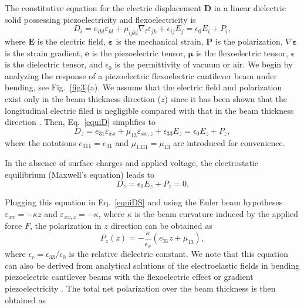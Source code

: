 \documentclass[%
 aps,prl,showpacs,
 amsmath,amssymb,
 reprint,%
]{revtex4-1}
\begin{document}
The constitutive equation for the electric displacement $\mathbf{D}$ in a linear dielectric solid possessing piezoelectricity and flexoelectricity is
\begin{equation}
D_i =  e_{ikl} \varepsilon_{kl} + \mu_{ijkl} \nabla_l \varepsilon_{jk} + \epsilon_{ij}E_j =  \epsilon_{0}E_i + P_i , \label{equiD}
\end{equation}
where $\mathbf{E}$ is the electric field, $\mathbf{\varepsilon}$ is the mechanical strain, $\mathbf{P}$ is the polarization, $\nabla \mathbf{\varepsilon}$ is the strain gradient,
 $\mathbf{e}$ is the piezoelectric tensor, $\mathbf{\mu}$  is the flexoelectric tensor, $\mathbf{\epsilon}$ is the dielectric tensor, and $\epsilon_0$ is the permittivity of vacuum or air. We begin by analyzing the response of a
piezoelectric flexoelectric cantilever beam under bending, see Fig.~\ref{fig3}(a). We assume that the electric field and polarization exist only in the 
beam thickness direction ($z$) since it has been shown that the longitudinal electric filed is negligible compared with that in the beam thickness direction \cite{Gao2007, Wang2010}. Then, Eq.~\eqref{equiD} simplifies to
\begin{equation}
D_z =  e_{31} \varepsilon_{xx} + \mu_{13} \varepsilon_{xx,z} + \epsilon_{33}E_z =  \epsilon_{0}E_z + P_z , \label{equiDS}
\end{equation}
where the notations $e_{311} = e_{31}$ and  $\mu_{1331} = \mu_{13}$ are introduced for convenience.

In the absence of surface charges and applied voltage, the electrostatic equilibrium (Maxwell's equation) leads to 
\begin{equation}
D_z  =  \epsilon_{0}E_z + P_z = 0. \label{equiD0}
\end{equation}

Plugging this equation in Eq.~\eqref{equiDS} and using the Euler beam hypotheses $\varepsilon_{xx} = -\kappa z$ and $\varepsilon_{xx,z} = -\kappa$, 
where $\kappa$ is the beam curvature induced by the applied force $F$, the polarization in $z$ direction can be obtained as
\begin{equation}
P_z (z) = - \frac{\kappa}{\epsilon_r} (e_{31} z + \mu_{13}), \label{equiPz}
\end{equation}
where $\epsilon_r = \epsilon_{33}/\epsilon_0$ is the relative dielectric constant. We note that this equation can also be derived from analytical solutions of the electroelastic fields 
in bending piezoelectric cantilever beams with the flexoelectric effect \cite{ref:Majdoub2008B, ref:Majdoub2009, ref:Yan2013-a} or gradient piezoelectricity \cite{ref:Williams1982, ref:Williams1983}. The total net polarization over the beam thickness is then obtained as
\end{document}
